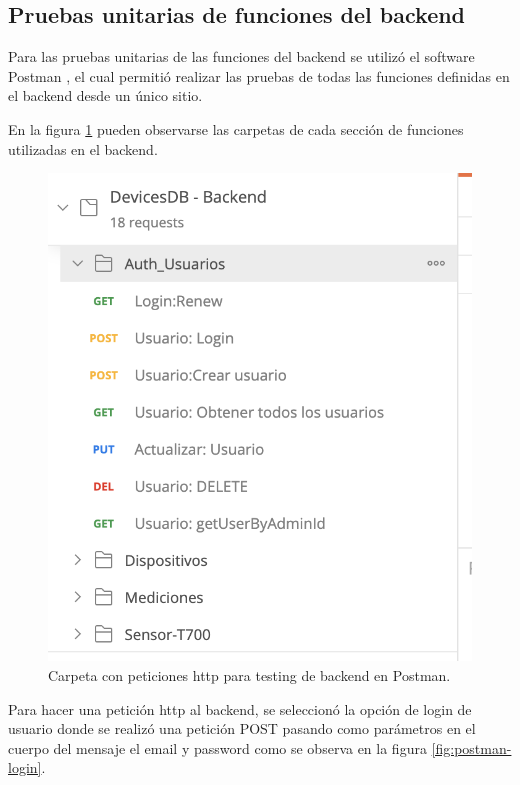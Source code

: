 \subsection{Pruebas unitarias de funciones del backend}
\label{backend-unit}
Para las pruebas unitarias de las funciones del backend se utilizó el software Postman \citep{WEBSITE:45}, el cual permitió realizar las pruebas de todas las funciones definidas en el backend desde un único sitio. 

En la figura \ref{fig:postman-backend} pueden observarse las carpetas de cada sección de funciones utilizadas en el backend. 

\begin{figure}[htpb]
	\centering
	\includegraphics[scale=.56]{./Figures/backend-postman.png}
	\caption[Carpetas de funciones para testing en Postman]{Carpeta con peticiones http para testing de backend en Postman.}
	\label{fig:postman-backend}
\end{figure}

\newpage

Para hacer una petición http al backend, se seleccionó la opción de login de usuario donde se realizó una petición POST pasando como parámetros en el cuerpo del mensaje el email y password como se observa en la figura \ref{fig:postman-login}.

